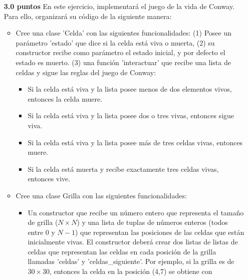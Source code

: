 \documentclass{article}
\begin{document}
\begin{itemize}
\begin{itemize}
    \end{itemize} %
    
    \item[\textbf{3.0 puntos}] En este ejercicio, implementará el juego de la vida de Conway. Para ello, organizará su código de la siguiente manera:
        \begin{itemize}
            \item Cree una clase 'Celda' con las siguientes funcionalidades: (1) Posee un parámetro 'estado' que dice si la celda está viva o muerta, (2) su constructor recibe como parámetro el estado inicial, y por defecto el estado es muerto. (3) una función 'interactuar' que recibe una lista de celdas y sigue las reglas del juego de Conway: 
                \begin{itemize}
                    \item Si la celda está viva y la lista posee menos de dos elementos vivos, entonces la celda muere.
                    \item Si la celda está viva y la lista posee dos o tres vivas, entonces sigue viva.
                    \item Si la celda está viva y la lista posee más de tres celdas vivas, entonces muere.
                    \item Si la celda está muerta y recibe exactamente tres celdas vivas, entonces vive.
                \end{itemize}

            \item Cree una clase Grilla con las siguientes funcionalidades: 
                \begin{itemize}
                    \item Un constructor que recibe un número entero que representa el tamaño de grilla ($N\times N$) y una lista de tuplas de números enteros (todos entre 0 y $N-1$) que representan las posiciones de las celdas que están inicialmente vivas. El constructor deberá crear dos listas de listas de celdas que representan las celdas en cada posición de la grilla llamadas 'celdas' y 'celdas\_siguiente'. Por ejemplo, si la grilla es de $30\times 30$, entonces la celda en la posición (4,7) se obtiene con 


\end{itemize}
\end{itemize}
\end{itemize}
\end{document}
